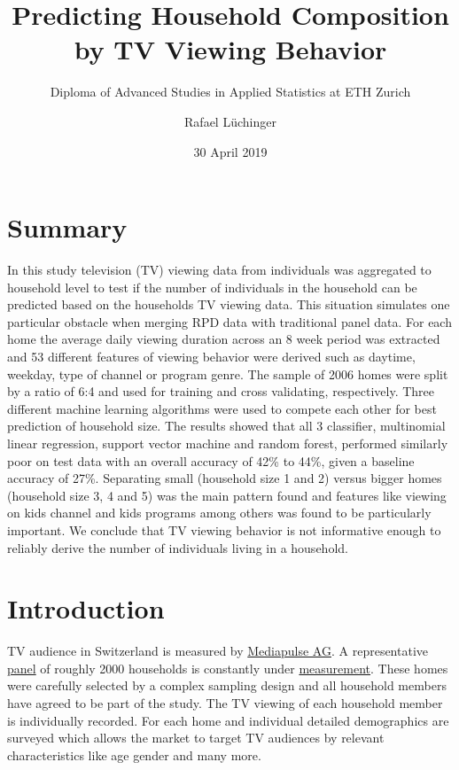 \documentclass[]{article}
\title{Predicting Household Composition by TV Viewing Behavior}
\subtitle{Diploma of Advanced Studies in Applied Statistics at ETH Zurich}
\author{Rafael Lüchinger}
\date{30 April 2019}
\begin{document}
\maketitle

{
\setcounter{tocdepth}{2}
\tableofcontents
}
\hypertarget{summary}{%
\section{Summary}\label{summary}}

In this study television (TV) viewing data from individuals was
aggregated to household level to test if the number of individuals in
the household can be predicted based on the households TV viewing data.
This situation simulates one particular obstacle when merging RPD data
with traditional panel data. For each home the average daily viewing
duration across an 8 week period was extracted and 53 different features
of viewing behavior were derived such as daytime, weekday, type of
channel or program genre. The sample of 2006 homes were split by a ratio
of 6:4 and used for training and cross validating, respectively. Three
different machine learning algorithms were used to compete each other
for best prediction of household size. The results showed that all 3
classifier, multinomial linear regression, support vector machine and
random forest, performed similarly poor on test data with an overall
accuracy of 42\% to 44\%, given a baseline accuracy of 27\%. Separating
small (household size 1 and 2) versus bigger homes (household size 3, 4
and 5) was the main pattern found and features like viewing on kids
channel and kids programs among others was found to be particularly
important. We conclude that TV viewing behavior is not informative
enough to reliably derive the number of individuals living in a
household.

\hypertarget{introduction}{%
\section{Introduction}\label{introduction}}

TV audience in Switzerland is measured by
\href{https:://www.mediapulse.ch/en}{Mediapulse AG}. A representative
\href{https:://www.mediapulse.ch/en/tv/research-method/the-panel.html}{panel}
of roughly 2000 households is constantly under
\href{https:://www.mediapulse.ch/en/tv/research-method/the-measuring-technique.html}{measurement}.
These homes were carefully selected by a complex sampling design and all
household members have agreed to be part of the study. The TV viewing of
each household member is individually recorded. For each home and
individual detailed demographics are surveyed which allows the market to
target TV audiences by relevant characteristics like age gender and many
more.
\end{document}
